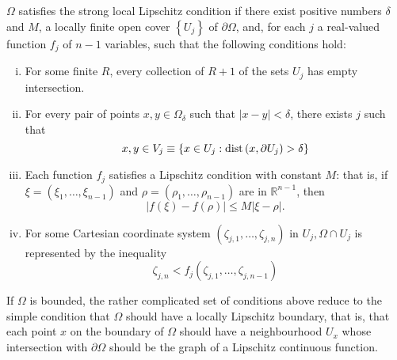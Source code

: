 \begin{para}
  $\Omega$ satisfies the strong local Lipschitz condition if there exist positive numbers $\delta$ and $M$, a locally finite open cover $\left\{U_j\right\}$ of $\partial\Omega$, and, for each $j$ a real-valued function $f_j$ of $n-1$ variables, such that the following conditions hold:
  
  \begin{enumerate}[(i)]
    \item For some finite $R$, every collection of $R+1$ of the sets $U_j$ has empty intersection.
    \item For every pair of points $x, y \in \Omega_\delta$ such that $|x-y|<\delta$,
      there exists $j$ such that
      \[
        x, y \in V_j \equiv\left\{x \in U_j: \operatorname{dist}\left(x, \partial U_j\right)>\delta\right\}
      \]
    \item Each function $f_j$ satisfies a Lipschitz condition with constant $M$:
      that is, if $\xi=\left(\xi_1, \ldots, \xi_{n-1}\right)$ and
      $\rho=\left(\rho_1, \ldots, \rho_{n-1}\right)$ are in $\mathbb{R}^{n-1}$, then
      \[|f(\xi)-f(\rho)| \leq M|\xi-\rho|.\]
    \item For some Cartesian coordinate system $\left(\zeta_{j, 1}, \ldots, \zeta_{j,n}\right)$
      in $U_j, \Omega \cap U_j$ is represented by the inequality
      \[
        \zeta_{j, n}<f_j\left(\zeta_{j, 1}, \ldots, \zeta_{j, n-1}\right)
      \]
  \end{enumerate}
  If $\Omega$ is bounded, the rather complicated set of conditions above reduce to the simple condition that $\Omega$ should have a locally Lipschitz boundary, that is, that each point $x$ on the boundary of $\Omega$ should have a neighbourhood $U_x$ whose intersection with $\partial\Omega$ should be the graph of a Lipschitz continuous function.
\end{para}


